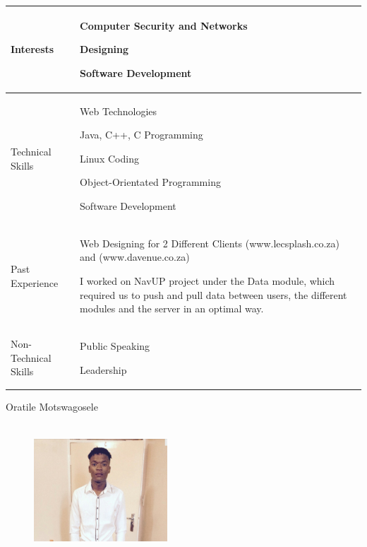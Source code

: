 \documentclass{article}
\begin{document}
\begin{center}
\begin{tabularx}{1.0\textwidth}{|p{3cm}|X|}
\hline
 {\LARGE Interests} & 
 \begin{compactitem}
     \item {\large Computer Security and Networks}
     \item {\large Designing}
     \item {\large Software Development}
 \end{compactitem} \\ 
 \hline
 {\LARGE Technical Skills} & 
 \begin{compactitem}
     \item {\large Web Technologies} 
     \item {\large Java, C++, C Programming}
     \item {\large Linux Coding}
     \item {\large Object-Orientated Programming}
     \item {\large Software Development}
 \end{compactitem} \\ 
 \hline
 {\LARGE Past Experience} & 
 \begin{compactitem}
     \item {\large Web Designing for 2 Different Clients (www.lecsplash.co.za) and (www.davenue.co.za)}
	 \item {\large I worked on NavUP project under the Data module, which required us to push and pull data between users, the different modules and the server in an optimal way.}
 \end{compactitem} \\ 
 \hline
 {\LARGE Non-Technical Skills} & 
 \begin{compactitem}
     \item {\large Public Speaking}
     \item {\large Leadership}
 \end{compactitem} \\
 \hline 
\end{tabularx}
\end{center}
\pagebreak
{\huge Oratile Motswagosele}
\begin{figure}[h]
\centering
\includegraphics[width=5cm, height=5cm]{Oratile.eps} 
\end{figure}
\end{document}
